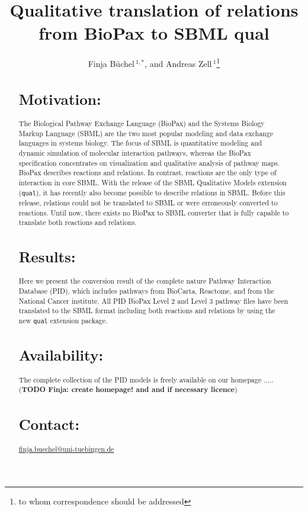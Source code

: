 \documentclass{bioinfo}
\newcommand{\qual}{\texttt{qual}}
\begin{document}

\title[BioPax to SBML qual]{Qualitative translation of relations from BioPax to SBML qual}
\author[B\"uchel \textit{et~al}]{Finja B\"uchel\,$^{1,*}$,
and Andreas Zell\,$^1$\footnote{to whom correspondence should be addressed}}
\address{$^{1}$Department of Cognitive Systems, University of Tuebingen, Sand 1,
72076 T\"ubingen, Germany}




\maketitle

\begin{abstract}

\section{Motivation:}
The Biological Pathway Exchange Language (BioPax) and the Systems Biology
Markup Language (SBML) are the two most popular modeling and data exchange
languages in systems biology.
The focus of SBML is quantitative modeling and dynamic simulation of molecular
interaction pathways, whereas the BioPax specification concentrates on
visualization and qualitative analysis of pathway maps.
BioPax describes reactions and relations. In contrast, reactions are the only
type of interaction in core SBML.
With the release of the SBML Qualitative Models extension (\qual), it
has recently also become possible to describe relations in SBML.
Before this release, relations could not be translated to SBML or were
erroneously converted to reactions. Until now, there exists no BioPax to
SBML converter that is fully capable to translate both reactions and
relations.
\section{Results:}
Here we present the conversion result of the complete nature Pathway Interaction
Database (PID), which includes pathways from BioCarta, Reactome, and from the
National Cancer institute.
All PID BioPax Level 2 and Level 3 pathway files have been translated
to the SBML format including both reactions and relations by using the new \qual{}
extension package.
\section{Availability:}
The complete collection of the PID models is freely available on our homepage ..... (\textbf{TODO Finja: create homepage! and and if necessary licence})
\section{Contact:} \href{finja.buechel@uni-tuebingen.de}{finja.buechel@uni-tuebingen.de}
\end{abstract}
\end{document}
